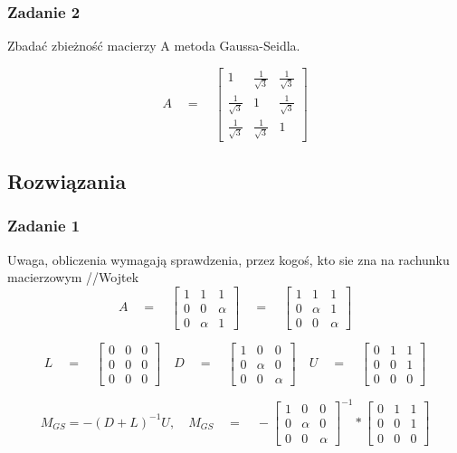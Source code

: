 \documentclass[a4paper]{article}
\begin{document}
\subsubsection{Zadanie 2}
Zbadać zbieżność macierzy A metoda Gaussa-Seidla.

$$A \quad = \quad 
\begin{bmatrix}
1 & \frac{1}{\sqrt{3}} &  \frac{1}{\sqrt{3}} \\
 \frac{1}{\sqrt{3}} & 1 &  \frac{1}{\sqrt{3}} \\
 \frac{1}{\sqrt{3}} &  \frac{1}{\sqrt{3}} & 1
\end{bmatrix}
$$
\subsection{Rozwiązania}

\subsubsection{Zadanie 1} 
Uwaga, obliczenia wymagają sprawdzenia, przez kogoś, kto sie zna na rachunku macierzowym //Wojtek
$$A \quad = \quad 
\begin{bmatrix}
1 & 1 &  1 \\
 0 & 0 &  \alpha \\
 0 &  \alpha & 1
\end{bmatrix}
\quad = \quad
\begin{bmatrix}
1 & 1 &  1 \\
0 &  \alpha & 1  \\
 0 & 0 &  \alpha
\end{bmatrix}
$$

$$L \quad = \quad 
\begin{bmatrix}
0 & 0 &  0 \\
 0 & 0 &  0 \\
 0 &  0 & 0
\end{bmatrix}
\quad
D \quad = \quad 
\begin{bmatrix}
1 & 0 &  0 \\
 0 & \alpha &  0 \\
 0 &  0 & \alpha
\end{bmatrix}
\quad
U \quad = \quad 
\begin{bmatrix}
0 & 1 & 1 \\
0 & 0 &  1 \\
 0 &  0 & 0
\end{bmatrix}
$$

$$M_{GS} = -(D+L)^{-1}U,\quad M_{GS}\quad = \quad -
\begin{bmatrix}
1 & 0 & 0 \\
 0 & \alpha & 0 \\
 0 &  0 & \alpha
\end{bmatrix}
^{-1} *
\begin{bmatrix}
0 & 1 & 1 \\
0 & 0 &  1 \\
 0 &  0 & 0
\end{bmatrix}
$$
\end{document}
